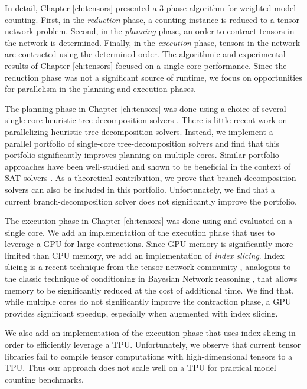 In detail, Chapter \ref{ch:tensors} presented a 3-phase algorithm for weighted model counting. First, in the \emph{reduction} phase, a counting instance is reduced to a tensor-network problem. Second, in the \emph{planning} phase, an order to contract tensors in the network is determined. Finally, in the \emph{execution} phase, tensors in the network are contracted using the determined order. The algorithmic and experimental results of Chapter \ref{ch:tensors} focused on a single-core performance.  Since the reduction phase was not a significant source of runtime, we focus on opportunities for parallelism in the planning and execution phases.

The planning phase in Chapter \ref{ch:tensors} was done using a choice of several single-core heuristic tree-decomposition solvers \cite{AMW17,HS18,Tamaki17}. There is little recent work on parallelizing heuristic tree-decomposition solvers. Instead, we implement a parallel portfolio of single-core tree-decomposition solvers and find that this portfolio significantly improves planning on multiple cores. Similar portfolio approaches have been well-studied and shown to be beneficial in the context of SAT solvers \cite{BSS15,XHHL08}. As a theoretical contribution, we prove that branch-decomposition solvers can also be included in this portfolio. Unfortunately, we find that a current branch-decomposition solver does not significantly improve the portfolio.

The execution phase in Chapter \ref{ch:tensors} was done using  \cite{numpy} and evaluated on a single core. We add an implementation of the execution phase that uses  \cite{ABCCDDDGII16} to leverage a GPU for large contractions. Since GPU memory is significantly more limited than CPU memory, we add an implementation of \emph{index slicing}. Index slicing is a recent technique from the tensor-network community \cite{CZHNS18,GK20,VBNHRBM19}, analogous to the classic technique of conditioning in Bayesian Network reasoning \cite{darwiche01,dechter99,pearl86,SAS94}, that allows memory to be significantly reduced at the cost of additional time. We find that, while multiple cores do not significantly improve the contraction phase, a GPU provides significant speedup, especially when augmented with index slicing. 

We also add an implementation of the execution phase that uses index slicing in order to efficiently leverage a TPU. 
Unfortunately, we observe that current tensor libraries fail to compile tensor computations with high-dimensional tensors to a TPU.
Thus our approach does not scale well on a TPU for practical model counting benchmarks.

